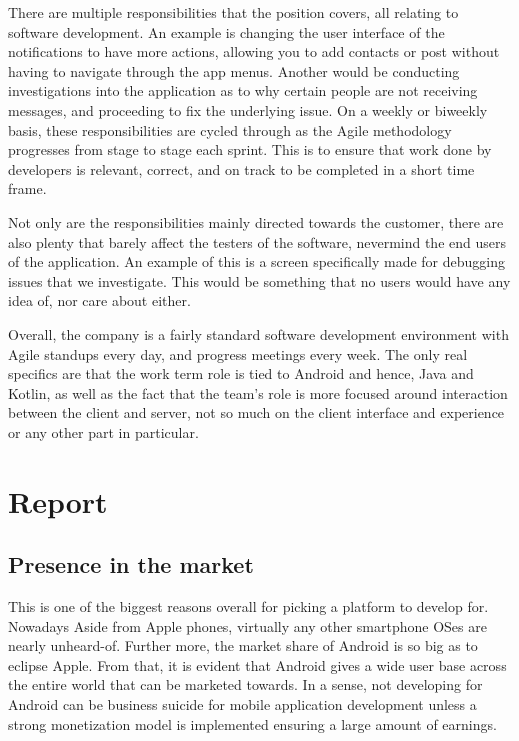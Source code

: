 \documentclass[12pt, letterpaper]{article}
\begin{document}
There are multiple responsibilities that the position covers, all relating
to software development. An example is changing the user interface of the 
notifications to have more actions, allowing you to add contacts or post 
without having to navigate through the app menus. Another would be 
conducting investigations into the application as to why certain people 
are not receiving messages, and proceeding to fix the underlying issue.
On a weekly or biweekly basis, these responsibilities are cycled through
as the Agile methodology progresses from stage to stage each sprint.
This is to ensure that work done by developers is relevant, correct, and on
track to be completed in a short time frame.

Not only are the responsibilities mainly directed towards the customer,
there are also plenty that barely affect the testers of the software,
nevermind the end users of the application. An example of this is a
screen specifically made for debugging issues that we investigate.
This would be something that no users would have any idea of, nor care 
about either.

Overall, the company is a fairly standard software development environment
with Agile standups every day, and progress meetings every week. The only 
real specifics are that the work term role is tied to Android and hence, 
Java and Kotlin, as well as the fact that the team's role is more focused 
around interaction between the client and server, not so much on the client
interface and experience or any other part in particular.

\section{Report}

\subsection{Presence in the market}
This is one of the biggest reasons overall for picking a platform to
develop for. Nowadays Aside from Apple phones, virtually any other
smartphone OSes are nearly unheard-of. Further more, the market share of
Android is so big as to eclipse Apple\cite{marketshare}. From that, it
is evident that Android gives a wide user base across the entire world
that can be marketed towards. In a sense, not developing for Android can
be business suicide for mobile application development unless a strong
monetization model is implemented ensuring a large amount of earnings.
\end{document}
